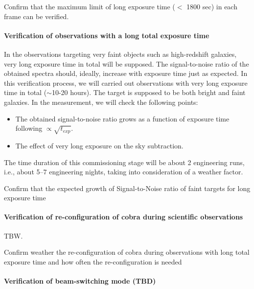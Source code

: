 \begin{itembox}[l]{}
Confirm that the maximum limit of long exposure time ($<$ 1800 sec) in each frame can be verified.
\end{itembox}

\paragraph{Verification of observations with a long total exposure time}
In the observations targeting very faint objects such as high-redshift galaxies, very long exposure time in total will be supposed. The signal-to-noise ratio of the obtained spectra should, ideally, increase with exposure time just as expected. In this verification process, we will carried out observations with very long exposure time in total ($\sim$10-20 hours). The target is supposed to be both bright and faint galaxies. In the measurement, we will check the following points:

\begin{itemize}
\item{The obtained signal-to-noise ratio grows as a function of exposure time following $\propto \sqrt{t_{exp}}$.} 
\item{The effect of very long exposure on the sky subtraction.}
\end{itemize}

The time duration of this commissioning stage will be about 2 engineering runs, i.e., about 5--7 engineering nights, taking into consideration of a weather factor.

\begin{itembox}[l]{}
Confirm that the expected growth of Signal-to-Noise ratio of faint targets for long exposure time
\end{itembox}

\paragraph{Verification of re-configuration of cobra during scientific observations}

TBW.

\begin{itembox}[l]{}
Confirm weather the re-configuration of cobra during observations with long total exposure time and how often the re-configuration is needed
\end{itembox}

\paragraph{Verification of beam-switching mode (TBD)}

